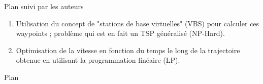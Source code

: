 \begin{frame}{Plan suivi par les auteurs}
 
\begin{enumerate}
	\suite
	\item Utilisation du concept de "stations de base virtuelles" (VBS) pour calculer ces waypoints ;  problème qui est en fait un TSP généralisé (NP-Hard).

	\item Optimisation de la vitesse en fonction du temps le long de la trajectoire obtenue
	en utilisant la programmation linéaire (LP).

\end{enumerate}

\end{frame}


\begin{frame}{Plan}
	\tableofcontents
\end{frame}